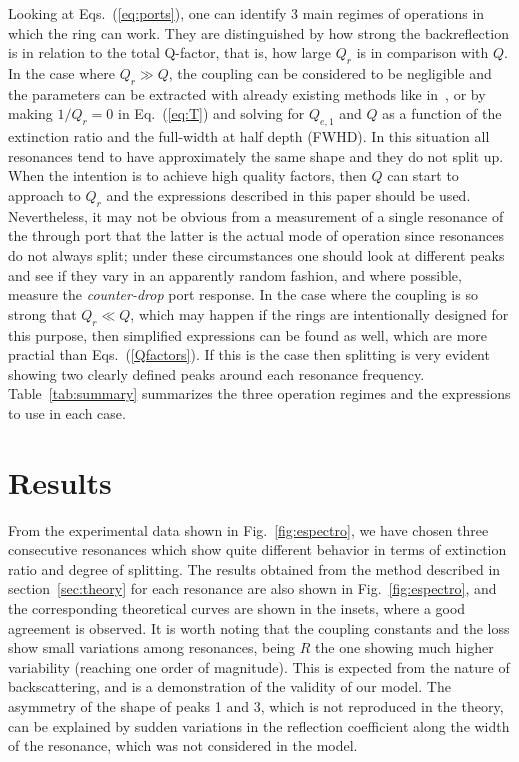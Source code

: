 Looking at Eqs.~(\ref{eq:ports}), one can identify 3 main regimes of operations in which the ring can work. They are distinguished by how strong the backreflection is in relation to the total Q-factor, that is, how large $Q_r$ is in comparison with $Q$. In the case where $Q_r \gg Q$, the coupling can be considered to be negligible and the parameters can be extracted with already existing methods like in~\cite{McKinnon2009}, or by making $1/Q_r=0$ in Eq.~(\ref{eq:T}) and solving for $Q_{e,1}$ and $Q$ as a function of the extinction ratio and the full-width at half depth (FWHD). In this situation all resonances tend to have approximately the same shape and they do not split up. When the intention is to achieve high quality factors, then $Q$ can start to approach to $Q_r$ and the expressions described in this paper should be used. Nevertheless, it may not be obvious from a measurement of a single resonance of the through port that the latter is the actual mode of operation since resonances do not always split; under these circumstances one should look at different peaks and see if they vary in an apparently random fashion, and where possible, measure the \emph{counter-drop} port response. In the case where the coupling is so strong that $Q_r \ll Q$, which may happen if the rings are intentionally designed for this purpose, then simplified expressions can be found as well, which are more practial than Eqs.~(\ref{Qfactors}).  If this is the case then splitting is very evident showing two clearly defined peaks around each resonance frequency. Table~\ref{tab:summary} summarizes the three operation regimes and the expressions to use in each case.


\section{Results}

From the experimental data shown in Fig.~\ref{fig:espectro}, we have chosen three consecutive resonances which show quite different behavior in terms of extinction ratio and degree of splitting. The results obtained from the method described in section~\ref{sec:theory} for each resonance are also shown in Fig.~\ref{fig:espectro}, and the corresponding theoretical curves are shown in the insets, where a good agreement is observed. It is worth noting that the coupling constants and the loss show small variations among resonances, being $R$ the one showing much higher variability (reaching one order of magnitude). This is expected from the nature of backscattering, and is a demonstration of the validity of our model. The asymmetry of the shape of peaks 1 and 3, which is not reproduced in the theory, can be explained by sudden variations in the reflection coefficient along the width of the resonance, which was not considered in the model.

